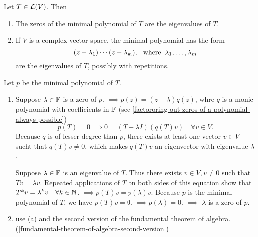 \setcounter{thm}{26}
\begin{thm} 
  \label{thm: eigenvalues are the zeros of the minimal polynomial}
  Let $T \in \mathcal{L}(V)$. Then
  \begin{enumerate}[label=(\alph*)]
    \item The zeros of the minimal polynomial of $T$ are the eigenvalues of $T$.
    \item If $V$ is a complex vector space, the minimal polynomial has the form 
    \begin{equation}
      (z-\lambda_1)\cdots(z-\lambda_m), \;\;\, \text{where}\;\; \lambda_1, \dots, \lambda_m
    \end{equation} are the eigenvalues of $T$, possibly with repetitions.
  \end{enumerate}
\end{thm}
\begin{prf} Let $p$ be the minimal polynomial of $T$.
  \begin{enumerate}[label=(\alph*)]
    \item Suppose $\lambda \in \mathbb{F}$ is a zero of $p$. $\implies p(z)=(z-\lambda)q(z)$, whre $q$ is a monic polynomial with coefficients in $\mathbb{F}$ (see \ref{factororing-out-zeros-of-a-polynomial-always-possible})
    \begin{equation}
      p(T)=0\implies 0=(T-\lambda I)(q(T)v) \quad \forall v\in V.
    \end{equation}
    Because $q$ is of lesser degree than $p$, there exists at least one vector $v\in V$ sucht that $q(T)v \neq 0$, which makes $q(T)v$ an eigenvector with eigenvalue $\lambda$.

    Suppose $\lambda \in \mathbb{F}$ is an eigenvalue of $T$. Thus there exists $v\in V, v \neq 0$ such that $Tv=\lambda v$. Repeated applications of $T$ on both sides of this equation show that $T^kv =\lambda^k v \quad \forall k\in \mathbb{N}$.
    $\implies p(T)v=p(\lambda)v$. Because $p$ is the minimal polynomial of $T$, we have $p(T)v=0$. $\implies p(\lambda) = 0$. $\implies$ $\lambda$ is a zero of $p$.

    \item use (a) and the second version of the fundamental theorem of algebra. (\ref{fundamental-theorem-of-algebra-second-version})
  \end{enumerate}
\end{prf}

